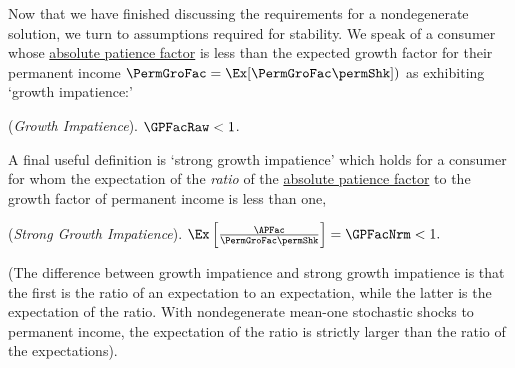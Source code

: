 \documentclass[BufferStockTheory]{subfiles}
\begin{document}

Now that we have finished discussing the requirements for a nondegenerate solution, we turn to assumptions required for stability.  We speak of a consumer whose \hyperlink{APFAC}{absolute patience factor} is less than the expected growth factor for their permanent income $\PermGroFac = \Ex[\PermGroFac \permShk])$ as exhibiting `growth impatience:' 
\hypertarget{GPFacRawDefn}{}
\hypertarget{GICRaw}{}
\begin{assumS}\label{ass:GICRaw} (\textit{Growth Impatience}).
$ \GPFacRaw  < 1$.
\end{assumS}

\begin{comment}
\begin{verbatimwrite}{\EqDir/GICRaw}
  \begin{equation}\begin{gathered}\begin{aligned}
        \text{\GICRaw:~~}  &&  \GPFacRaw  < 1 . \phantom{/\PermGroFac}&  \phantom{\text{\GICRaw:~~}} \label{eq:GICRaw}
      \end{aligned}\end{gathered}\end{equation}
\end{verbatimwrite}

\end{assumS}
\end{comment}

A final useful definition is `strong growth impatience' which holds for a consumer for whom the expectation of the \textit{ratio} of the \hyperlink{APFAC}{absolute patience factor} to the growth factor of permanent income is less than one, 
\hypertarget{GICMod}{}
\begin{assumS}(\textit{Strong Growth Impatience}). \label{ass:GICMod}
$ \Ex\left[\frac{\APFac}{\PermGroFac \permShk}\right] = \GPFacNrm  < 1.$
\end{assumS}

(The difference between growth impatience and strong growth impatience is that the first is the ratio of an expectation to an expectation, while the latter is the expectation of the ratio.  With nondegenerate mean-one stochastic shocks to permanent income, the expectation of the ratio is strictly larger than the ratio of the expectations).

\begin{comment}
\begin{verbatimwrite}{\EqDir/GICMod}
  \begin{align}
    \text{{\GICMod}:~~}    \GPFacNrm  & < 1 .  \phantom{\text{{\GICMod}:~~}}\label{eq:GICMod}
  \end{align}\end{verbatimwrite}

\end{comment}
\end{document}
